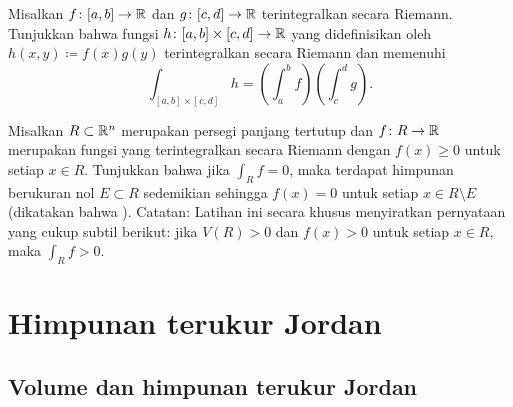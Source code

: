 \begin{exercise}
Misalkan $f \colon [a,b] \to {\mathbb{R}}$ dan $g \colon [c,d] \to {\mathbb{R}}$ terintegralkan
secara Riemann. Tunjukkan bahwa fungsi
$h \colon [a,b] \times [c,d] \to {\mathbb{R}}$ yang didefinisikan oleh
$h(x,y) \coloneqq f(x) g(y)$ terintegralkan secara Riemann dan memenuhi
\begin{equation*}
\int_{[a,b] \times [c,d]} h =
\left( \int_a^b f \right)
\left( \int_c^d g \right) .
\end{equation*}
\end{exercise}

\begin{exercise}
Misalkan $R \subset {\mathbb{R}}^n$ merupakan persegi panjang tertutup dan
$f \colon R \to {\mathbb{R}}$ merupakan fungsi yang terintegralkan secara Riemann dengan
$f(x) \geq 0$ untuk setiap $x \in R$. Tunjukkan bahwa jika $\int_R f = 0$,
maka terdapat himpunan berukuran nol $E \subset R$ sedemikian sehingga
$f(x) = 0$ untuk setiap $x \in R \setminus E$
(dikatakan bahwa ).
Catatan: Latihan ini secara khusus menyiratkan pernyataan yang cukup subtil
berikut: jika $V(R)>0$ dan $f(x) > 0$ untuk setiap $x \in R$, maka
$\int_R f > 0$.
\end{exercise}



\sectionnewpage
\section{Himpunan terukur Jordan}
\label{sec:jordansets}



\subsection{Volume dan himpunan terukur Jordan}

